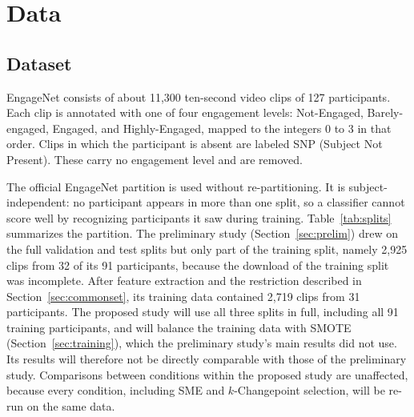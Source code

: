 
\section{Data}
\label{sec:data}

\subsection{Dataset}

EngageNet \cite{singh2023} consists of about 11,300 ten-second video clips of 127 participants. Each clip is annotated with one of four engagement levels: Not-Engaged, Barely-engaged, Engaged, and Highly-Engaged, mapped to the integers 0 to 3 in that order. Clips in which the participant is absent are labeled SNP (Subject Not Present). These carry no engagement level and are removed.

The official EngageNet partition is used without re-partitioning. It is subject-independent: no participant appears in more than one split, so a classifier cannot score well by recognizing participants it saw during training. Table~\ref{tab:splits} summarizes the partition. The preliminary study (Section~\ref{sec:prelim}) drew on the full validation and test splits but only part of the training split, namely 2,925 clips from 32 of its 91 participants, because the download of the training split was incomplete. After feature extraction and the restriction described in Section~\ref{sec:commonset}, its training data contained 2,719 clips from 31 participants. The proposed study will use all three splits in full, including all 91 training participants, and will balance the training data with SMOTE (Section~\ref{sec:training}), which the preliminary study's main results did not use. Its results will therefore not be directly comparable with those of the preliminary study. Comparisons between conditions within the proposed study are unaffected, because every condition, including SME and $k$-Changepoint selection, will be re-run on the same data.

